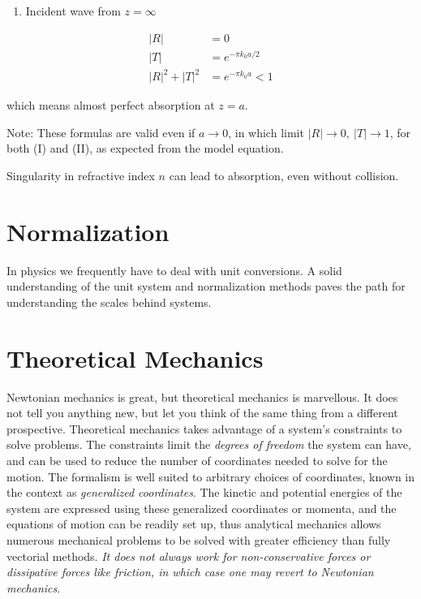 \documentclass[
  notoc %
]{tufte-book}
\providecommand{\tightlist}{%
  \setlength{\itemsep}{0pt}\setlength{\parskip}{0pt}
}
\begin{document}
\begin{enumerate}
\def\labelenumi{(\Roman{enumi})}
\setcounter{enumi}{1}
\tightlist
\item
  Incident wave from \(z=\infty\)
\end{enumerate}

\[
\begin{aligned}
|R| &= 0 \\
|T| &= e^{-\pi k_0 a/2} \\
|R|^2 + |T|^2 &= e^{-\pi k_0 a} < 1
\end{aligned}
\]

which means almost perfect absorption at \(z=a\).

Note: These formulas are valid even if \(a\rightarrow0\), in which limit
\(|R|\rightarrow 0,\ |T|\rightarrow 1\), for both (I) and (II), as
expected from the model equation.

Singularity in refractive index \(n\) can lead to absorption, even
without collision.

\hypertarget{normalization}{%
\section{Normalization}\label{normalization}}

In physics we frequently have to deal with unit conversions. A solid
understanding of the unit system and normalization methods paves the
path for understanding the scales behind systems.

\hypertarget{theoretical-mechanics}{%
\section{Theoretical Mechanics}\label{theoretical-mechanics}}

Newtonian mechanics is great, but theoretical mechanics is marvellous.
It does not tell you anything new, but let you think of the same thing
from a different prospective. Theoretical mechanics takes advantage of a
system's constraints to solve problems. The constraints limit the
\emph{degrees of freedom} the system can have, and can be used to reduce
the number of coordinates needed to solve for the motion. The formalism
is well suited to arbitrary choices of coordinates, known in the context
as \emph{generalized coordinates}. The kinetic and potential energies of
the system are expressed using these generalized coordinates or momenta,
and the equations of motion can be readily set up, thus analytical
mechanics allows numerous mechanical problems to be solved with greater
efficiency than fully vectorial methods. \emph{It does not always work
for non-conservative forces or dissipative forces like friction, in
which case one may revert to Newtonian mechanics}.
\end{document}
